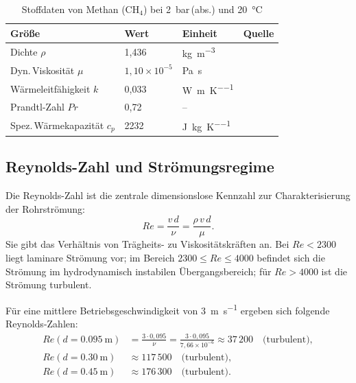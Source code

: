 ﻿\documentclass[12pt,a4paper,twoside]{article}
\theoremstyle{plain}
\theoremstyle{definition}
\theoremstyle{remark}
\newcommand{\Rey}{\mathit{Re}}
\newcommand{\Pra}{\mathit{Pr}}
\begin{document}
\begin{table}[htbp]
\centering
\caption{Stoffdaten von Methan ($\mathrm{CH_4}$) bei \SI{2}{\bar}\,(abs.)
         und \SI{20}{\degreeCelsius}}
\label{tab:stoffdaten}
\begin{tabularx}{\linewidth}{@{}lllX@{}}
\toprule
Größe & Wert & Einheit & Quelle \\
\midrule
Dichte $\rho$           & 1{,}436   & \si{\kilogram\per\metre\cubed} & \cite{Baehr2016} \\
Dyn.\,Viskosität $\mu$  & $1{,}10\times10^{-5}$ & \si{\pascal\second} & \cite{Baehr2016} \\
Wärmeleitfähigkeit $k$  & 0{,}033   & \si{\watt\per\metre\per\kelvin} & \cite{Baehr2016} \\
Prandtl-Zahl $\Pra$     & 0{,}72    & --                              & \cite{Baehr2016} \\
Spez.\,Wärmekapazität $c_p$ & 2232  & \si{\joule\per\kilogram\per\kelvin} & \cite{Baehr2016} \\
\bottomrule
\end{tabularx}
\end{table}

\subsection{Reynolds-Zahl und Strömungsregime}
\label{ssec:reynolds}

Die Reynolds-Zahl ist die zentrale dimensionslose Kennzahl zur Charakterisierung
der Rohrströmung:
\begin{equation}
  \Rey = \frac{v \, d}{\nu} = \frac{\rho \, v \, d}{\mu}.
  \label{eq:reynolds}
\end{equation}
Sie gibt das Verhältnis von Trägheits- zu Viskositätskräften an.
Bei $\Rey < 2300$ liegt laminare Strömung vor; im Bereich $2300 \le \Rey \le 4000$
befindet sich die Strömung im hydrodynamisch instabilen Übergangsbereich; für
$\Rey > 4000$ ist die Strömung turbulent.

Für eine mittlere Betriebsgeschwindigkeit von \SI{3}{\metre\per\second} ergeben
sich folgende Reynolds-Zahlen:
\begin{align}
  \Rey(d = \SI{0.095}{\metre}) &= \frac{3 \cdot 0{,}095}{\nu}
    = \frac{3 \cdot 0{,}095}{7{,}66\times10^{-6}} \approx 37\,200
    \quad \text{(turbulent)}, \label{eq:Re_klein} \\
  \Rey(d = \SI{0.30}{\metre})  &\approx 117\,500 \quad \text{(turbulent)}, \\
  \Rey(d = \SI{0.45}{\metre})  &\approx 176\,300 \quad \text{(turbulent)}.
\end{align}
\end{document}
